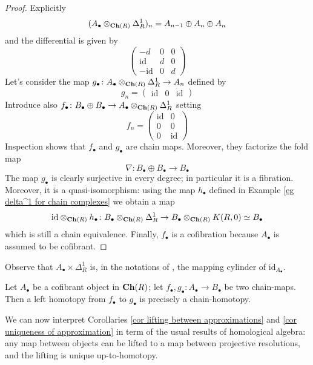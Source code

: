 \begin{refsection}
\begin{proof}
Explicitly
\[
(A_\bullet \otimes_{\mathbf{Ch}(R)} \Delta^1_R)_n = A_{n-1} \oplus A_n \oplus A_n
\]
and the differential is given by
\[
\begin{pmatrix}
- d & 0 & 0 \\ \mathrm{id} & d & 0 \\ - \mathrm{id} & 0 & d
\end{pmatrix}
\]
Let's consider the map $g_\bullet \colon A_\bullet \otimes_{\mathbf{Ch}(R)} \Delta^1_R \to A_n$ defined by
\[
g_n = \begin{pmatrix} \mathrm{id} & 0 & \mathrm{id} \end{pmatrix}
\]
Introduce also $f_\bullet \colon B_\bullet \oplus B_\bullet \to A_\bullet \otimes_{\mathbf{Ch}(R)} \Delta^1_R$ setting
\[
f_n = \begin{pmatrix} \mathrm{id} & 0 \\ 0 & 0 \\ 0 & \mathrm{id} \end{pmatrix}
\]
Inspection shows that $f_\bullet$ and $g_\bullet$ are chain maps. Moreover, they factorize the fold map
\[
\nabla \colon B_\bullet \oplus B_\bullet \to B_\bullet
\]
The map $g_\bullet$ is clearly surjective in every degree; in particular it is a fibration. Moreover, it is a quasi-isomorphism: using the map $h_\bullet$ defined in Example \ref{eg delta^1 for chain complexes} we obtain a map
\[
\mathrm{id} \otimes_{\mathbf{Ch}(R)} h_\bullet \colon B_\bullet \otimes_{\mathbf{Ch}(R)} \Delta^1_R \to B_\bullet \otimes_{\mathbf{Ch}(R)} K(R,0) \simeq B_\bullet
\]
which is still a chain equivalence. Finally, $f_\bullet$ is a cofibration because $A_\bullet$ is assumed to be cofibrant.
\end{proof}

\begin{rmk}
Observe that $A_\bullet \times \Delta^1_R$ is, in the notations of \cite[Ch. 1.5]{weibel}, the mapping cylinder of $\mathrm{id}_{A_\bullet}$.
\end{rmk}

\begin{cor}
Let $A_\bullet$ be a cofibrant object in $\mathbf{Ch}(R)$; let $f_\bullet, g_\bullet \colon A_\bullet \to B_\bullet$ be two chain-maps. Then a left homotopy from $f_\bullet$ to $g_\bullet$ is precisely a chain-homotopy.
\end{cor}

\begin{rmk}
We can now interpret Corollaries \ref{cor lifting between approximations} and \ref{cor uniqueness of approximation} in term of the usual results of homological algebra: any map between objects can be lifted to a map between projective resolutions, and the lifting is unique up-to-homotopy.
\end{rmk}


\end{refsection}
